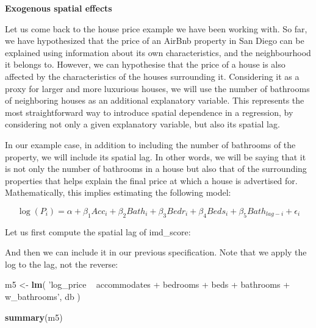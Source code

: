 \documentclass[
]{book}
\newenvironment{Shaded}{\begin{snugshade}}{\end{snugshade}}
\newcommand{\KeywordTok}[1]{\textcolor[rgb]{0.13,0.29,0.53}{\textbf{#1}}}
\newcommand{\NormalTok}[1]{#1}
\newcommand{\OperatorTok}[1]{\textcolor[rgb]{0.81,0.36,0.00}{\textbf{#1}}}
\newcommand{\StringTok}[1]{\textcolor[rgb]{0.31,0.60,0.02}{#1}}
\begin{document}
\textbf{Exogenous spatial effects}

Let us come back to the house price example we have been working with. So far, we have hypothesized that the price of an AirBnb property in San Diego can be explained using information about its own characteristics, and the neighbourhood it belongs to. However, we can hypothesise that the price of a house is also affected by the characteristics of the houses surrounding it. Considering it as a proxy for larger and more luxurious houses, we will use the number of bathrooms of neighboring houses as an additional explanatory variable. This represents the most straightforward way to introduce spatial dependence in a regression, by considering not only a given explanatory variable, but also its spatial lag.

In our example case, in addition to including the number of bathrooms of the property, we will include its spatial lag. In other words, we will be saying that it is not only the number of bathrooms in a house but also that of the surrounding properties that helps explain the final price at which a house is advertised for. Mathematically, this implies estimating the following model:

\[
\log(P_i) = \alpha + \beta_1 Acc_i + \beta_2 Bath_i + \beta_3 Bedr_i + \beta_4 Beds_i+ \beta_5 Bath_{lag-i} + \epsilon_i
\]

Let us first compute the spatial lag of imd\_score:

\begin{Shaded}
\end{Shaded}

And then we can include it in our previous specification. Note that we apply the log to the lag, not the reverse:

\begin{Shaded}
\begin{Highlighting}[]
\NormalTok{m5 <-}\StringTok{ }\KeywordTok{lm}\NormalTok{(}
  \StringTok{'log_price ~ accommodates + bedrooms + beds + bathrooms + w_bathrooms'}\NormalTok{,}
\NormalTok{  db}
\NormalTok{)}

\KeywordTok{summary}\NormalTok{(m5)}
\end{Highlighting}
\end{Shaded}
\end{document}
